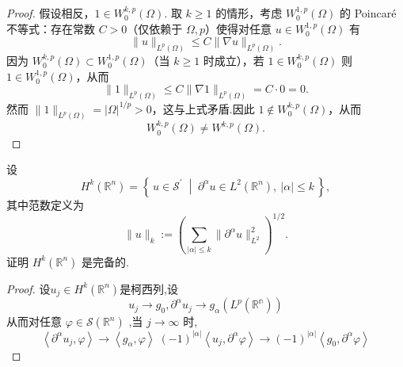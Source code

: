\documentclass[lang=cn,newtx,10pt,scheme=chinese,thmcnt=chapter]{elegantbook}
\begin{document}
\begin{problemset}
\begin{proof}
假设相反，$1\in W^{k,p}_0(\Omega)$. 取 $k\ge1$ 的情形，考虑 $W^{1,p}_0(\Omega)$ 的 Poincaré 不等式：存在常数 $C>0$（仅依赖于 $\Omega,p$）使得对任意 $u\in W^{1,p}_0(\Omega)$ 有
\[
\|u\|_{L^p(\Omega)} \le C\|\nabla u\|_{L^p(\Omega)}.
\]
因为 $W^{k,p}_0(\Omega)\subset W^{1,p}_0(\Omega)$（当 $k\ge1$ 时成立），若 $1\in W^{k,p}_0(\Omega)$ 则 $1\in W^{1,p}_0(\Omega)$，从而
\[
\|1\|_{L^p(\Omega)} \le C\|\nabla 1\|_{L^p(\Omega)} = C\cdot 0 = 0.
\]
然而 $\|1\|_{L^p(\Omega)} = |\Omega|^{1/p}>0$，这与上式矛盾.因此 $1\notin W^{k,p}_0(\Omega)$，从而
\[
W^{k,p}_0(\Omega)\neq W^{k,p}(\Omega).
\]
\end{proof}
\item 设
\[
{H}^{k}({\mathbb{R}}^{n}) = \left\{\, u \in {\mathcal{S}}^{\prime} \;\middle|\; {\partial}^{\alpha}u \in {L}^{2}({\mathbb{R}}^{n}),~|\alpha| \leqslant k \,\right\},
\]
其中范数定义为
\[
\|u\|_{k} := \left( \sum_{|\alpha| \leqslant k} \|{\partial}^{\alpha}u\|_{L^{2}}^{2} \right)^{1/2}.
\]
证明 \({H}^{k}({\mathbb{R}}^{n})\) 是完备的.
\begin{proof}
  设$u_j\in H^k(\mathbb{R}^n)$是柯西列,设\[
  u_j\to g_0,\partial^\alpha u_j \to g_\alpha(L^p(\mathbb{R^n}))  \]
从而对任意 \(\varphi  \in  \mathcal{S}\left( \mathbb{R}^n \right)\) ,当 \(j \rightarrow  \infty\) 时,
\begin{equation*}
\left\langle  {{\partial }^{\alpha }{u}_{j},\varphi }\right\rangle\to 
\left\langle  {{g}_{\alpha },\varphi }\right\rangle  \;   {\left( -1\right) }^{\left| \alpha \right| }\left\langle  {{u}_{j},{\partial }^{\alpha }\varphi }\right\rangle\to{\left( -1\right) }^{\left| \alpha \right| }\left\langle  {{g}_{0},{\partial }^{\alpha }\varphi }\right\rangle  
\end{equation*}


\end{proof}
\end{problemset}
\end{document}
